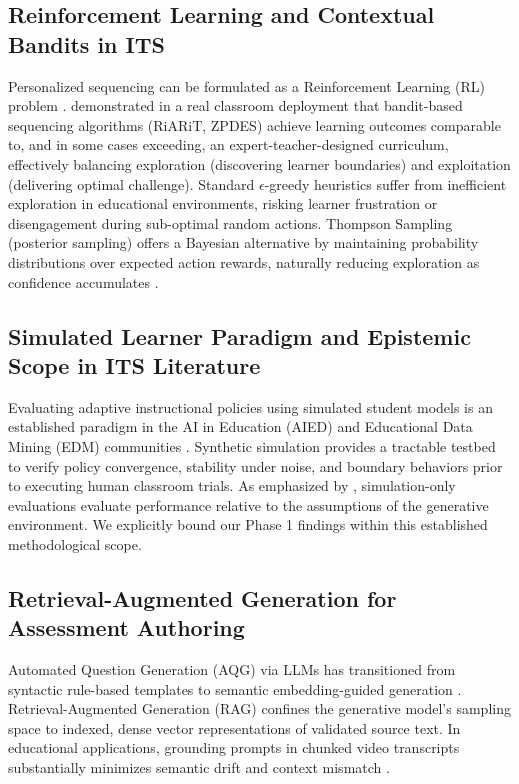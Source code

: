 \documentclass[pdflatex,sn-apa]{sn-jnl}
\begin{document}
\subsection{Reinforcement Learning and Contextual Bandits in ITS}\label{sec2.2}

Personalized sequencing can be formulated as a Reinforcement Learning (RL) problem \citep{doroudi2019where}. \citet{clement2015multi} demonstrated in a real classroom deployment that bandit-based sequencing algorithms (RiARiT, ZPDES) achieve learning outcomes comparable to, and in some cases exceeding, an expert-teacher-designed curriculum, effectively balancing exploration (discovering learner boundaries) and exploitation (delivering optimal challenge). Standard $\epsilon$-greedy heuristics suffer from inefficient exploration in educational environments, risking learner frustration or disengagement during sub-optimal random actions. Thompson Sampling (posterior sampling) offers a Bayesian alternative by maintaining probability distributions over expected action rewards, naturally reducing exploration as confidence accumulates \citep{agrawal2012analysis,chapelle2011empirical,clement2015multi}.

\subsection{Simulated Learner Paradigm and Epistemic Scope in ITS Literature}\label{sec2.3}

Evaluating adaptive instructional policies using simulated student models is an established paradigm in the AI in Education (AIED) and Educational Data Mining (EDM) communities \citep{vanlehn2006behavior,rafferty2016faster,doroudi2019where}. Synthetic simulation provides a tractable testbed to verify policy convergence, stability under noise, and boundary behaviors prior to executing human classroom trials. As emphasized by \citet{doroudi2019where}, simulation-only evaluations evaluate performance relative to the assumptions of the generative environment. We explicitly bound our Phase 1 findings within this established methodological scope.

\subsection{Retrieval-Augmented Generation for Assessment Authoring}\label{sec2.4}

Automated Question Generation (AQG) via LLMs has transitioned from syntactic rule-based templates to semantic embedding-guided generation \citep{lewis2020retrieval,scarlatos2024distractor}. Retrieval-Augmented Generation (RAG) confines the generative model's sampling space to indexed, dense vector representations of validated source text. In educational applications, grounding prompts in chunked video transcripts substantially minimizes semantic drift and context mismatch \citep{gao2023retrieval,niu2024reducing}.
\end{document}
